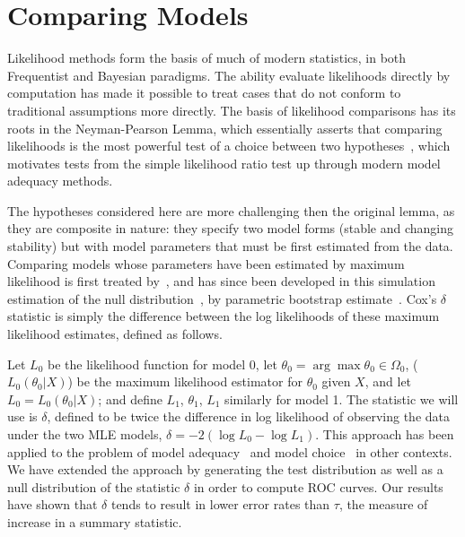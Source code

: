\documentclass[11pt]{elsarticle}
\begin{document}
%
\appendix
\renewcommand*\thefigure{S\arabic{figure}}
\renewcommand*\theequation{S\arabic{equation}}
\section{Comparing Models}\label{Cox}
Likelihood methods form the basis of much of modern statistics, in both Frequentist and Bayesian paradigms.  
The ability evaluate likelihoods directly by computation has made it possible to treat cases that do not conform to traditional assumptions more directly.
The basis of likelihood comparisons has its roots in the Neyman-Pearson Lemma, 
which essentially asserts that comparing likelihoods is the most powerful test
of a choice between two hypotheses~\citep{Neyman1933}, which motivates
tests from the simple likelihood ratio test up through modern model adequacy methods.

The hypotheses considered here are more challenging then the original lemma, as they are composite in nature:
they specify two model forms (stable and changing stability)
but with model parameters that must be first estimated from the data.
Comparing models whose parameters have been estimated by maximum likelihood is first treated by~\citet{Cox1961, Cox1962},
and has since been developed in this simulation estimation of the null distribution~\citep{McLachlan1987}, by parametric bootstrap estimate~\citep{Efron1987}.  
Cox's $\delta$ statistic is simply the difference between the log likelihoods of these maximum likelihood estimates, defined as follows.

Let $L_0$ be the likelihood function for model 0, 
let $\theta_0 = \arg \max \theta_0 \in \Omega_0$, ($L_0 (\theta_0 |X)$) 
be the maximum likelihood estimator for $\theta_0$ given $X$, and let $L_0 = L_0 (\theta_0 |X)$; 
and define $L_1$, $\theta_1$, $L_1$ similarly for model 1. 
The statistic we will use is $\delta$, 
defined to be twice the difference in log likelihood of observing the data under the two MLE models,
$\delta = -2 (\log L_0 - \log L_1 )$.  
This approach has been applied to the problem of model adequacy~\citep{Goldman1993} and model choice~\citep{Huelsenbeck1996} in other contexts.  
We have extended the approach by generating the test distribution as well as a null distribution of the statistic $\delta$ in order to compute ROC curves.  
Our results have shown that $\delta$ tends to result in lower error rates than $\tau$, the measure of increase in a summary statistic.  
\end{document}
